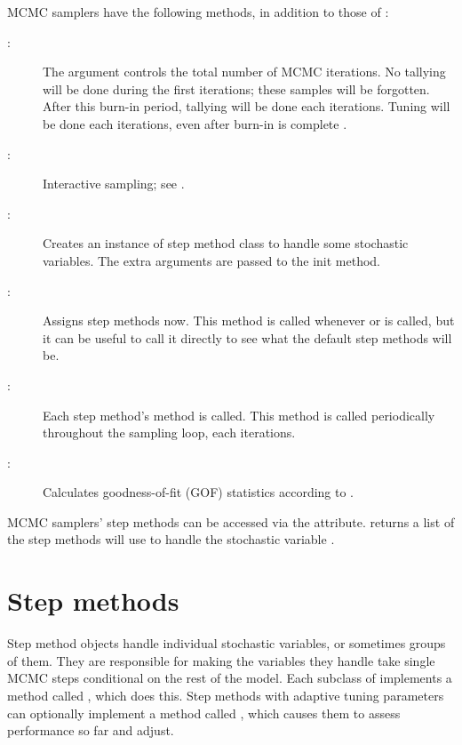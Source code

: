 MCMC samplers have the following methods, in addition to those of :
\begin{description}
    \item[:] The  argument controls the total number of MCMC iterations. No tallying will be done during the first  iterations; these samples will be forgotten. After this burn-in period, tallying will be done each  iterations. Tuning will be done each  iterations, even after burn-in is complete \cite{tuning,Haario:2001lr}.
    \item[:] Interactive sampling; see .
    \item[:] Creates an instance of step method class  to handle some stochastic variables. The extra arguments are passed to the init method.
    \item[:] Assigns step methods now. This method is called whenever  or  is called, but it can be useful to call it directly to see what the default step methods will be.
    \item[:] Each step method's  method is called. This method is called periodically throughout the sampling loop, each  iterations.
    \item[:] Calculates goodness-of-fit (GOF) statistics according to \cite{Brooks:2000il}.
\end{description}

MCMC samplers' step methods can be accessed via the  attribute.  returns a list of the step methods  will use to handle the stochastic variable .


\hypertarget{step-method}{}
\section*{Step methods} \label{sec:stepmethod}


Step method objects handle individual stochastic variables, or sometimes groups of them. They are responsible for making the variables they handle take single MCMC steps conditional on the rest of the model. Each subclass of  implements a method called , which does this. Step methods with adaptive tuning parameters can optionally implement a method called , which causes them to assess performance so far and adjust.

